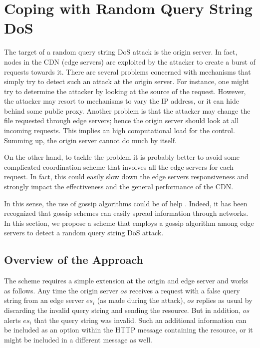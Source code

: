 \documentclass{IEEEtran}
\begin{document}
\section{Coping with Random Query String DoS}
\label{sec:alg}

The target of a random query string DoS attack is the origin server. In fact, nodes in the CDN (edge servers) are exploited by the attacker to create a burst of requests towards it.
There are several problems concerned with mechanisms that simply try to detect such an attack at the origin server. 
For instance, one might try to determine the attacker by looking at the source of the request. However, the attacker may resort to mechanisms to vary the IP address, or it can hide behind some public proxy.
Another problem is that the attacker may change the file requested through edge servers; hence the origin server should look at all incoming requests. This implies an high computational load for the control.
Summing up, the origin server cannot do much by itself.

On the other hand, to tackle the problem it is probably better to avoid some complicated coordination scheme that involves all the edge servers for each request. In fact, this could easily slow down the edge servers responsiveness and strongly impact the effectiveness and the general performance of the CDN.

In this sense, the use of gossip algorithms could be of help \cite{simutools,disio11}.
Indeed, it has been recognized that gossip schemes can easily spread information through networks.
In this section, we propose a scheme that employs a gossip algorithm among edge servers to detect a random query string DoS attack.

\subsection{Overview of the Approach}

The scheme requires a simple extension at the origin and edge server and works as follows. 
Any time the origin server $os$ receives a request with a false query string from an edge server $es_i$  (as made during the attack), $os$  replies as usual by discarding the invalid query string and sending the resource.
But in addition, $os$ alerts $es_i$ that the query string was invalid. Such an additional information can be included as an option within the HTTP message containing the resource, or it might be included in a different message as well.
\end{document}
